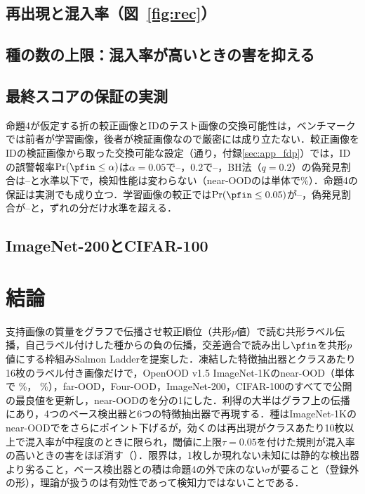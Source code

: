 \subsection{再出現と混入率（図~\ref{fig:rec}）}
\label{sec:rec}


\subsection{種の数の上限：混入率が高いときの害を抑える}
\label{sec:cap}


\subsection{最終スコアの保証の実測}
\label{sec:fdp}
命題4が仮定する折の較正画像とIDのテスト画像の交換可能性は，ベンチマークでは前者が学習画像，後者が検証画像なので厳密には成り立たない．較正画像をIDの検証画像から取った交換可能な設定（\NVcalNSplits{}通り，付録\ref{sec:app_fdp}）では，IDの誤警報率$\Pr(\pfin\le\alpha)$は$\alpha{=}0.05$で\NVcalFprZeroZeroFiveMin{}--\NVcalFprZeroZeroFiveMax{}，$0.2$で\NVcalFprZeroTwoMin{}--\NVcalFprZeroTwoMax{}，BH法（$q{=}0.2$）の偽発見割合は\NVcalBhFdpMin{}--\NVcalBhFdpMax{}と水準以下で，検知性能は変わらない（near-OODの\FPR{}は単体で\NVcalAloneNearFpr\%）．命題4の保証は実測でも成り立つ．学習画像の較正では$\Pr(\pfin\le0.05)$が\NVtrainFprZeroZeroFiveMin{}--\NVtrainFprZeroZeroFiveMax{}，偽発見割合が\NVtrainBhFdpMin{}--\NVtrainBhFdpMax{}と，ずれの分だけ水準を超える．

\subsection{ImageNet-200とCIFAR-100}
\label{sec:in200}


\section{結論}
支持画像の質量をグラフで伝播させ較正順位（共形$p$値）で読む共形ラベル伝播，自己ラベル付けした種からの負の伝播，交差適合で読み出し$\pfin$を共形$p$値にする枠組みSalmon Ladderを提案した．凍結した特徴抽出器とクラスあたり16枚のラベル付き画像だけで，OpenOOD v1.5 ImageNet-1Kのnear-OOD（単体で\AUC{} \NAloneNearAuroc\%，\FPR{} \NAloneNearFpr\%），far-OOD，Four-OOD，ImageNet-200，CIFAR-100のすべてで公開の最良値を更新し，near-OODの\FPR{}を\NAloneNearFprRatioVsBestOther{}分の1にした．利得の大半はグラフ上の伝播にあり，4つのベース検出器と6つの特徴抽出器で再現する．種はImageNet-1Kのnear-OODで\FPR{}をさらに\NAloneNearDfprVsLpAbs{}ポイント下げるが，効くのは再出現がクラスあたり10枚以上で混入率が中程度のときに限られ，閾値に上限$\tau{=}0.05$を付けた規則が混入率の高いときの害をほぼ消す（）．限界は，1枚しか現れない未知には静的な検出器より劣ること，ベース検出器との積は命題4の外で床のない$\sigma$が要ること（登録外の形），理論が扱うのは有効性であって検知力ではないことである．


